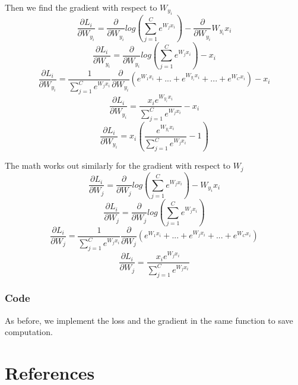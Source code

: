 \documentclass[12pt]{article}
\begin{document}
\noindent Then we find the gradient with respect to $W_{y_{i}}$
\begin{equation}
    \frac{\partial L_{i}}{\partial W_{y_{i}}} = \frac{\partial}{\partial W_{y_{i}}} 
    log({\sum_{j=1}^C e^{W_{j}x_{i}}}) 
    - \frac{\partial}{\partial W_{y_{i}}}W_{y_{i}}x_{i}
\end{equation}
\begin{equation}
    \frac{\partial L_{i}}{\partial W_{y_{i}}} = \frac{\partial}{\partial W_{y_{i}}} 
    log({\sum_{j=1}^C e^{W_{j}x_{i}}}) 
    - x_{i}
\end{equation}
\begin{equation}
    \frac{\partial L_{i}}{\partial W_{y_{i}}} = \frac{1}{\sum_{j=1}^C e^{W_{j}x_{i}}}
    \frac{\partial}{\partial W_{y_{i}}} 
    (e^{W_{1}x_{i}}+...+e^{W_{y_{i}}x_{i}}+...+e^{W_{C}x_{i}})
    - x_{i}
\end{equation}
\begin{equation}
    \frac{\partial L_{i}}{\partial W_{y_{i}}} = \frac{x_{i}e^{W_{y_{i}}x_{i}}}
    {\sum_{j=1}^C e^{W_{j}x_{i}}} - x_{i}
\end{equation}
\begin{equation}
    \frac{\partial L_{i}}{\partial W_{y_{i}}} = x_{i} (\frac{e^{W_{y_{i}}x_{i}}}
    {\sum_{j=1}^C e^{W_{j}x_{i}}} - 1)
\end{equation}

\noindent The math works out similarly for the gradient with respect to $W_{j}$
\begin{equation}
    \frac{\partial L_{i}}{\partial W_{j}} = \frac{\partial}{\partial W_{j}} 
    log({\sum_{j=1}^C e^{W_{j}x_{i}}}) 
    - W_{y_{i}}x_{i}
\end{equation}
\begin{equation}
    \frac{\partial L_{i}}{\partial W_{j}} = \frac{\partial}{\partial W_{j}} 
    log({\sum_{j=1}^C e^{W_{j}x_{i}}}) 
\end{equation}
\begin{equation}
    \frac{\partial L_{i}}{\partial W_{j}} = \frac{1}{\sum_{j=1}^C e^{W_{j}x_{i}}}
    \frac{\partial}{\partial W_{j}} 
    (e^{W_{1}x_{i}}+...+e^{W_{j}x_{i}}+...+e^{W_{C}x_{i}})
\end{equation}
\begin{equation}
    \frac{\partial L_{i}}{\partial W_{j}} = \frac{x_{i}e^{W_{j}x_{i}}}
    {\sum_{j=1}^C e^{W_{j}x_{i}}}
\end{equation}

\subsubsection{Code}
As before, we implement the loss and the gradient in the same function to save computation.

\section{References}
\
\end{document}

